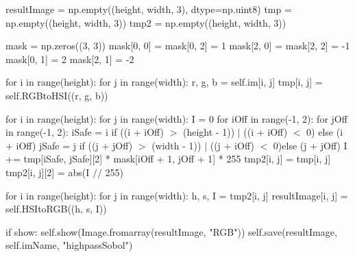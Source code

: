 \documentclass[final,a4paper,openany,12pt]{mwbk}
\begin{document}
resultImage = np.empty((height, width, 3), dtype=np.uint8) \newline
\indent tmp = np.empty((height, width, 3)) \newline
\indent tmp2 = np.empty((height, width, 3)) \newline

mask = np.zeros((3, 3)) \newline
\indent mask[0, 0] = mask[0, 2] = 1 \newline
\indent mask[2, 0] = mask[2, 2] = -1 \newline
\indent mask[0, 1] = 2 \newline
\indent mask[2, 1] = -2 \newline

for i in range(height): \newline
\indent for j in range(width): \newline
\indent r, g, b = self.im[i, j] \newline
\indent tmp[i, j] = self.RGBtoHSI((r, g, b)) \newline

for i in range(height): \newline
\indent for j in range(width): \newline
\indent I = 0 \newline
\indent for iOff in range(-1, 2): \newline
\indent for jOff in range(-1, 2): \newline
\indent iSafe = i if ((i + iOff) $>$ (height - 1)) $\mid$ ((i + iOff) $<$ 0) else (i + iOff) \newline
\indent jSafe = j if ((j + jOff) $>$ (width - 1)) $\mid$ ((j + iOff) $<$ 0)else (j + jOff) \newline
\indent I += tmp[iSafe, jSafe][2] * mask[iOff + 1, jOff + 1] * 255 \newline
\indent tmp2[i, j] = tmp[i, j] \newline
\indent tmp2[i, j][2] = abs(I $//$ 255) \newline


for i in range(height): \newline
\indent for j in range(width): \newline
\indent h, s, I = tmp2[i, j] \newline
\indent resultImage[i, j] = self.HSItoRGB((h, s, I)) \newline

if show: \newline
\indent self.show(Image.fromarray(resultImage, "RGB")) \newline
\indent self.save(resultImage, self.imName, "highpassSobol") \newline
\newpage
\end{document}
